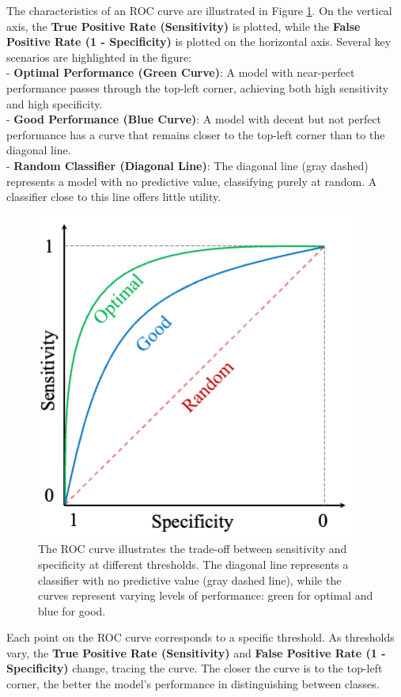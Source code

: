 \documentclass[
]{book}
\theoremstyle{definition}
\theoremstyle{definition}
\theoremstyle{definition}
\theoremstyle{definition}
\theoremstyle{remark}
\begin{document}
The characteristics of an ROC curve are illustrated in Figure \ref{fig:roc-curve}. On the vertical axis, the \textbf{True Positive Rate (Sensitivity)} is plotted, while the \textbf{False Positive Rate (1 - Specificity)} is plotted on the horizontal axis. Several key scenarios are highlighted in the figure:\\
- \textbf{Optimal Performance (Green Curve)}: A model with near-perfect performance passes through the top-left corner, achieving both high sensitivity and high specificity.\\
- \textbf{Good Performance (Blue Curve)}: A model with decent but not perfect performance has a curve that remains closer to the top-left corner than to the diagonal line.\\
- \textbf{Random Classifier (Diagonal Line)}: The diagonal line (gray dashed) represents a model with no predictive value, classifying purely at random. A classifier close to this line offers little utility.

\begin{figure}

{\centering \includegraphics[width=0.6\linewidth]{images/roc-curve} 

}

\caption{The ROC curve illustrates the trade-off between sensitivity and specificity at different thresholds. The diagonal line represents a classifier with no predictive value (gray dashed line), while the curves represent varying levels of performance: green for optimal and blue for good.}\label{fig:roc-curve}
\end{figure}

Each point on the ROC curve corresponds to a specific threshold. As thresholds vary, the \textbf{True Positive Rate (Sensitivity)} and \textbf{False Positive Rate (1 - Specificity)} change, tracing the curve. The closer the curve is to the top-left corner, the better the model's performance in distinguishing between classes.
\end{document}

